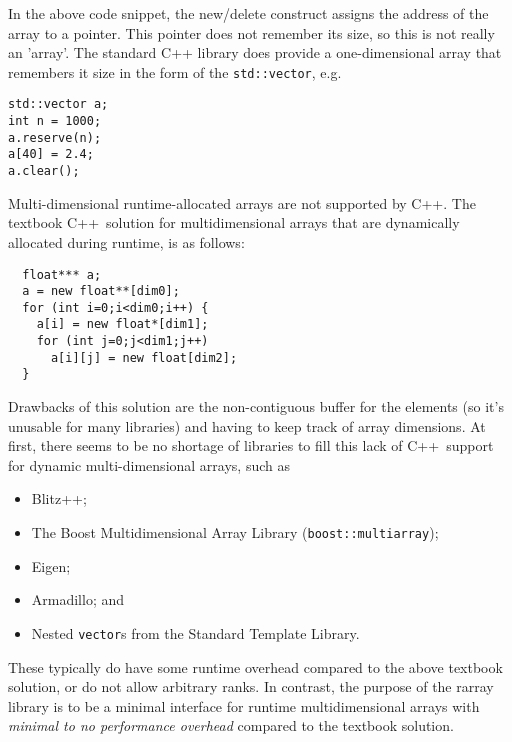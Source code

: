 \documentclass[11pt,twoside]{article}
\newcommand{\cxx}{C{++}}
\begin{document}
In the above code snippet, the new/delete construct assigns the address of the array to a pointer. This pointer does not remember its size, so this is not really an 'array'.  The standard C++ library does provide a one-dimensional array that remembers it size in the form of the \texttt{std::vector}, e.g.
\vspace{-5pt}\begin{framed}\vspace{-14pt}%
\begin{verbatim}
std::vector a;
int n = 1000;
a.reserve(n);
a[40] = 2.4;
a.clear();
\end{verbatim}%
\vspace{-12pt}\end{framed}\vspace{-5pt}%

Multi-dimensional runtime-allocated arrays are not supported by \cxx.
The textbook \cxx\ solution for multidimensional arrays that are
dynamically allocated during runtime, is as follows:
\vspace{-5pt}\begin{framed}\vspace{-14pt}%
\begin{verbatim}
  float*** a;
  a = new float**[dim0];
  for (int i=0;i<dim0;i++) {
    a[i] = new float*[dim1];
    for (int j=0;j<dim1;j++) 
      a[i][j] = new float[dim2];
  }
\end{verbatim}%
\vspace{-12pt}\end{framed}\vspace{-5pt}%
Drawbacks of this solution are the non-contiguous buffer for the
elements (so it's unusable for many libraries) and having to keep
track of array dimensions.
At first, there seems to be no shortage of libraries to fill this
lack of \cxx\ support for dynamic multi-dimensional arrays, such as
\begin{itemize}\itemsep 0pt \parskip 0pt
\item Blitz++;
\item The Boost Multidimensional Array Library (\texttt{boost::multiarray}); 
\item Eigen;
\item Armadillo; and
\item Nested \texttt{vector}s from the Standard Template Library.
\end{itemize}
These typically do have some runtime overhead compared to the above
textbook solution, or do not allow arbitrary ranks. In contrast, the purpose of the rarray
library is to be a minimal interface for runtime multidimensional arrays with
\emph{minimal to no performance overhead} compared to the textbook solution.
\end{document}

